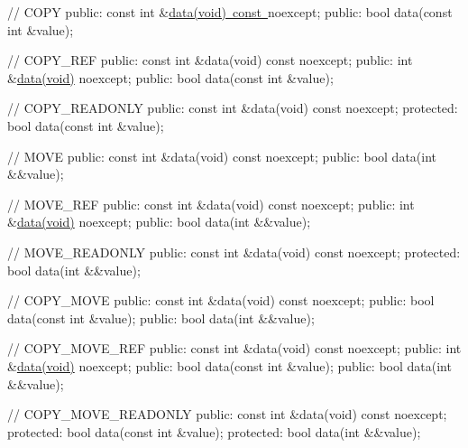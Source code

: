 // C\+O\+PY public\+: const int \&\mbox{\hyperlink{_item_8hpp_a14daa076c7b211481a71809e6c36a79f}{data(void) const }}noexcept; public\+: bool data(const int \&value);

// C\+O\+P\+Y\+\_\+\+R\+EF public\+: const int \&data(void) const noexcept; public\+: int \&\mbox{\hyperlink{_item_8hpp_a14daa076c7b211481a71809e6c36a79f}{data(void)}} noexcept; public\+: bool data(const int \&value);

// C\+O\+P\+Y\+\_\+\+R\+E\+A\+D\+O\+N\+LY public\+: const int \&data(void) const noexcept; protected\+: bool data(const int \&value);

// M\+O\+VE public\+: const int \&data(void) const noexcept; public\+: bool data(int \&\&value);

// M\+O\+V\+E\+\_\+\+R\+EF public\+: const int \&data(void) const noexcept; public\+: int \&\mbox{\hyperlink{_item_8hpp_a14daa076c7b211481a71809e6c36a79f}{data(void)}} noexcept; public\+: bool data(int \&\&value);

// M\+O\+V\+E\+\_\+\+R\+E\+A\+D\+O\+N\+LY public\+: const int \&data(void) const noexcept; protected\+: bool data(int \&\&value);

// C\+O\+P\+Y\+\_\+\+M\+O\+VE public\+: const int \&data(void) const noexcept; public\+: bool data(const int \&value); public\+: bool data(int \&\&value);

// C\+O\+P\+Y\+\_\+\+M\+O\+V\+E\+\_\+\+R\+EF public\+: const int \&data(void) const noexcept; public\+: int \&\mbox{\hyperlink{_item_8hpp_a14daa076c7b211481a71809e6c36a79f}{data(void)}} noexcept; public\+: bool data(const int \&value); public\+: bool data(int \&\&value);

// C\+O\+P\+Y\+\_\+\+M\+O\+V\+E\+\_\+\+R\+E\+A\+D\+O\+N\+LY public\+: const int \&data(void) const noexcept; protected\+: bool data(const int \&value); protected\+: bool data(int \&\&value); 
